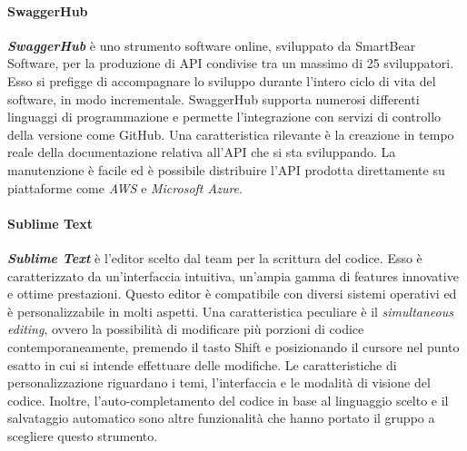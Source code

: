 		\paragraph{SwaggerHub}
		\textbf{\textit{SwaggerHub}} è uno strumento software online, sviluppato da SmartBear Software, per la produzione di API condivise tra un massimo di 25 sviluppatori. Esso si prefigge di accompagnare lo sviluppo durante l'intero ciclo di vita del software, in modo incrementale. SwaggerHub supporta numerosi differenti linguaggi di programmazione e permette l'integrazione con servizi di controllo della versione come GitHub. 
		Una caratteristica rilevante è la creazione in tempo reale della documentazione relativa all'API che si sta sviluppando. La manutenzione è facile ed è possibile distribuire l'API prodotta direttamente su piattaforme come \textit{AWS} e \textit{Microsoft Azure}.
		
		\paragraph{Sublime Text}
		\textbf{\textit{Sublime Text}} è l'editor scelto dal team per la scrittura del codice. Esso è caratterizzato da un'interfaccia intuitiva, un'ampia gamma di features innovative e ottime prestazioni. Questo editor è compatibile con diversi sistemi operativi ed è personalizzabile in molti aspetti. Una caratteristica peculiare è il \textit{simultaneous editing}, ovvero la possibilità di modificare più porzioni di codice contemporaneamente, premendo il tasto Shift e posizionando il cursore nel punto esatto in cui si intende effettuare delle modifiche. Le caratteristiche di personalizzazione riguardano i temi, l'interfaccia e le modalità di visione del codice. Inoltre, l'auto-completamento del codice in base al linguaggio scelto e il salvataggio automatico sono altre funzionalità che hanno portato il gruppo a scegliere questo strumento.
